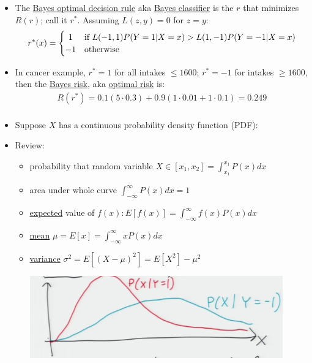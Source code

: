 \documentclass[10pt]{article}
\begin{document}
\begin{itemize}
\begin{align*}
							+ L(r(x), 1)\frac{P(X=x|Y=-1)(P(Y=-1)}{P(x)})P(x)\\
					&= P(Y=1)\sum_{x} L(r(x), 1)P(X=x|Y=1) +
						P(Y=-1)\sum_{x} L(r(x), -1)P(X=x|Y=-1)\\
			\end{align*}
		\item The \underline{Bayes optimal decision rule} aka \underline{Bayes classifier} is the $r$ that minimizes $R(r)$; call it $r^{*}$. Assuming $L(z, y) = 0$ for $z=y$:
			\[
 				r^{*}(x) = \left\{\def\arraystretch{1.2}%
 					\begin{array}{@{}c@{\quad}l@{}}
    					1 & \text{if $L(-1,1)P(Y=1|X=x) > L(1,-1)P(Y=-1|X=x$)}\\
   						-1 & \text{otherwise}\\
						\end{array}\right.
			\]
		\item In cancer example, $r^{*} = 1$ for all intakes $\leq 1600$; $r^{*} = -1$ for intakes $\geq 1600$, then the \underline{Bayes risk}, aka \underline{optimal risk} is:
		\begin{align*}
			R(r^{*}) = 0.1(5\cdot 0.3) + 0.9(1 \cdot 0.01 + 1 \cdot 0.1) = 0.249\\
		\end{align*}
		\item Suppose $X$ has a continuous probability density function (PDF):
		\item Review:
			\begin{itemize}
				\item probability that random variable
				$X \in [x_{1}, x_{2}] = \int_{x_{1}}^{x_{1}} P(x) dx$\\
				\item area under whole curve $\int_{-\infty}^{\infty} P(x) dx = 1$\\
				\item \underline{expected} value of $f(x): E[f(x)] = \int_{-\infty}^{\infty} f(x)P(x) dx$\\
				\item \underline{mean} $\mu = E[x] = \int_{-\infty}^{\infty} xP(x) dx$\\
				\item \underline{variance} 
					$\sigma^{2} = E[(X-\mu)^{2}] = E[X^{2}] - \mu^{2}$\\
					\begin{center}
						\includegraphics[scale=0.5]{images/gaus}

\end{center}
\end{itemize}
\end{itemize}
\end{document}
